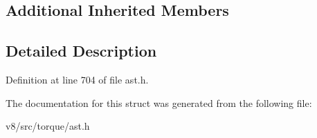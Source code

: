 \subsection*{Additional Inherited Members}


\subsection{Detailed Description}


Definition at line 704 of file ast.\+h.



The documentation for this struct was generated from the following file\+:\begin{DoxyCompactItemize}
\item 
v8/src/torque/ast.\+h\end{DoxyCompactItemize}
